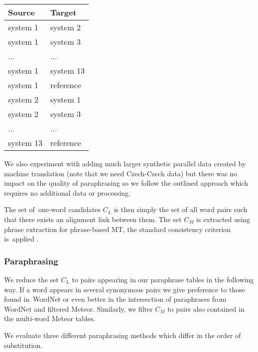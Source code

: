 \documentclass[11pt]{article}
\begin{document}
\begin{description}
\begin{center}
\begin{tabular}{ll}
Source & Target \\
\hline
system 1 & system 2 \\
system 1 & system 3 \\
... & ...\\
system 1 & system 13 \\
system 1 & reference \\
system 2 & system 1 \\
system 2 & system 3 \\
... & ... \\
system 13 & reference \\
\end{tabular}
\end{center}

We also experiment with adding much larger synthetic parallel data created by
machine translation (note that we need Czech-Czech data) but there was no impact
on the quality of paraphrasing so we follow the outlined approach which requires
no additional data or processing.

The set of~one-word candidates $C_L$ is then simply the set of all word pairs such
that there exists an alignment link between them. The set $C_M$ is extracted
using phrase extraction for phrase-based MT, the standard consistency criterion
is~applied \cite{Och99improvedalignment}.
\end{description}

\subsubsection{Paraphrasing}
We reduce the set $ C_{L} $ to pairs appearing in our paraphrase tables in the 
following way. If a word appears in several synonymous pairs we give preference 
to those found in~WordNet or even better in the intersection of paraphrases from 
WordNet and filtered Meteor. Similarly, we filter $ C_{M} $ to pairs also contained 
in the multi-word Meteor tables.

We evaluate three different paraphrasing methods which differ in the order of
substitution.
\end{document}
